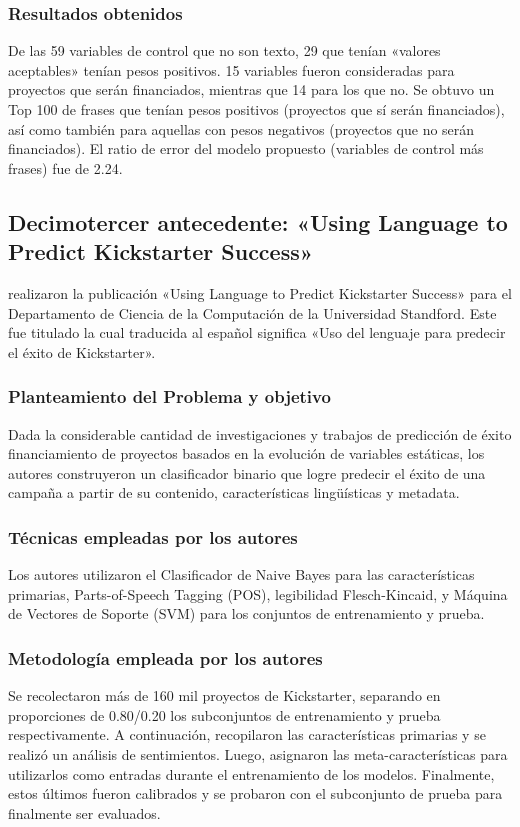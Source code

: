 \subsubsection{Resultados obtenidos}
De las 59 variables de control que no son texto, 29 que tenían «valores aceptables» tenían pesos positivos. 15 variables fueron consideradas para proyectos que serán financiados, mientras que 14 para los que no. Se obtuvo un Top 100 de frases que tenían pesos positivos (proyectos que sí serán financiados), así como también para aquellas con pesos negativos (proyectos que no serán financiados).
El ratio de error del modelo propuesto (variables de control más frases) fue de 2.24.

\subsection{Decimotercer antecedente: «Using Language to Predict Kickstarter Success» \citep*{pr_sawhney2016usingLT}}
\citeauthor{pr_sawhney2016usingLT} realizaron la publicación «Using Language to Predict Kickstarter Success» para el Departamento de Ciencia de la Computación de la Universidad Standford. Este fue titulado  la cual traducida al español significa «Uso del lenguaje para predecir el éxito de Kickstarter».

\subsubsection{Planteamiento del Problema y objetivo}
Dada la considerable cantidad de investigaciones y trabajos de predicción de éxito financiamiento de proyectos basados en la evolución de variables estáticas, los autores construyeron un clasificador binario que logre predecir el éxito de una campaña a partir de su contenido, características lingüísticas y metadata.

\subsubsection{Técnicas empleadas por los autores}
Los autores utilizaron el Clasificador de Naive Bayes para las características primarias, Parts-of-Speech Tagging (POS), legibilidad Flesch-Kincaid, y Máquina de Vectores de Soporte (SVM) para los conjuntos de entrenamiento y prueba.

\subsubsection{Metodología empleada por los autores}
Se recolectaron más de 160 mil proyectos de Kickstarter, separando en proporciones de 0.80/0.20 los subconjuntos de entrenamiento y prueba respectivamente. A continuación, recopilaron las características primarias y se realizó un análisis de sentimientos. Luego, asignaron las meta-características para utilizarlos como entradas durante el entrenamiento de los modelos. Finalmente, estos últimos fueron calibrados y se probaron con el subconjunto de prueba para finalmente ser evaluados.


